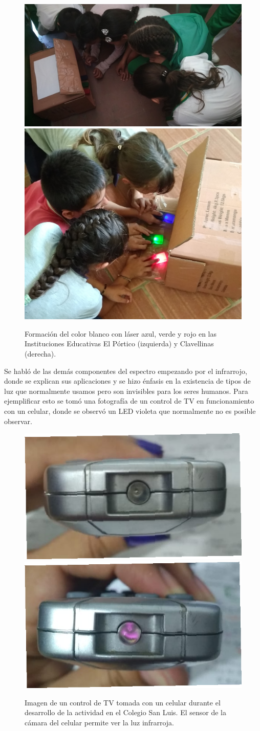 \documentclass[a4paper,10pt]{article}
\begin{document}
\begin{figure}[H]
    \centering
    \includegraphics[width = 8.8 cm]{Imagenes/laseresportico.jpg}
    \includegraphics[width = 5.6 cm]{Imagenes/laseresclave.jpg}
    \caption{Formación del color blanco con láser azul, verde y rojo en las Instituciones Educativas El Pórtico (izquierda) y Clavellinas (derecha).}
\end{figure}



\noindent Se habló de las demás componentes del espectro empezando por el infrarrojo, donde se explican sus aplicaciones y se hizo énfasis en la existencia de tipos de luz que normalmente usamos pero son invisibles para los seres humanos. Para ejemplificar esto se tomó una fotografía de un control de TV en funcionamiento con un celular, donde se observó un LED violeta que normalmente no es posible observar.


\begin{figure}[H]
    \centering
    \includegraphics[width = 5.8 cm]{Imagenes/infra2.png}
    \includegraphics[width = 5.8 cm]{Imagenes/infra.png}
    \caption{Imagen de un control de TV tomada con un celular durante el desarrollo de la actividad en el Colegio San Luis. El sensor de la cámara del celular permite ver la luz infrarroja. 
    }
\end{figure}
\end{document}
